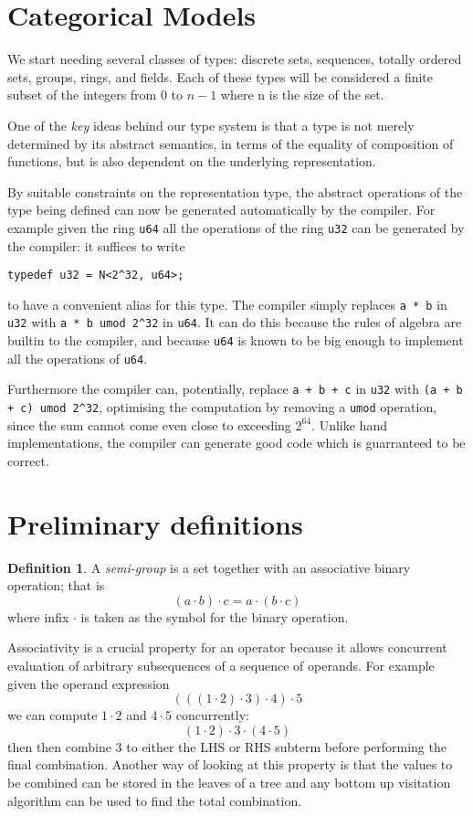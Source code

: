 \documentclass[oneside]{book}
\theoremstyle{plain}
\theoremstyle{definition}
\newtheorem{definition}{Definition}
\theoremstyle{plain}
\begin{document}
\section{Categorical Models}
We start needing  several classes of types: discrete sets, sequences, totally ordered
sets, groups, rings, and fields.
Each of these types will be considered a finite subset of the integers 
from 0 to $n-1$ where n is the size of the set.

One of the {\em key} ideas behind our type system is that a type is not merely
determined by its abstract semantics, in terms of the equality of 
composition of functions, but is also dependent on the underlying representation.

By suitable constraints on the representation type, the abstract operations
of the type being defined can now be generated automatically by the compiler.
For example given the ring \verb$u64$ all the operations of the ring \verb$u32$
can be generated by the compiler: it suffices to write
\begin{verbatim}
typedef u32 = N<2^32, u64>;
\end{verbatim}
to have a convenient alias for this type. The compiler simply replaces \verb$a * b$ in
\verb$u32$ with \verb$a * b umod 2^32$ in \verb$u64$. It can do this because the rules
of algebra are builtin to the compiler, and because \verb$u64$ is known to be big enough
to implement all the operations of \verb$u64$.

Furthermore the compiler can, potentially, replace \verb$a + b + c$ in \verb$u32$
with \verb$(a + b + c) umod 2^32$, optimising the computation by removing a \verb$umod$
operation, since the sum cannot come even close to exceeding $2^{64}$. Unlike hand 
implementations, the compiler can generate good code which is guarranteed to be correct.




\section{Preliminary definitions}
\begin{definition}
A {\em semi-group} is a set together with an associative binary operation; that is
$$(a \cdot b)\cdot c = a \cdot (b \cdot c)$$
where infix $\cdot$ is taken as the symbol for the binary operation.
\end{definition}

Associativity is a crucial property for an operator because it allows concurrent
evaluation of arbitrary subsequences of a sequence of operands. For example given
the operand expression 
$$(((1\cdot2)\cdot3)\cdot4)\cdot5$$
we can compute $1\cdot2$ and $4\cdot5$ concurrently:
$$(1\cdot2)\cdot3\cdot(4\cdot5)$$
then then combine 3 to either the LHS or RHS subterm before performing the final combination.
Another way of looking at this property is that the values to be combined can be stored in
the leaves of a tree and any bottom up visitation algorithm can be used to find the total combination.
\end{document}

